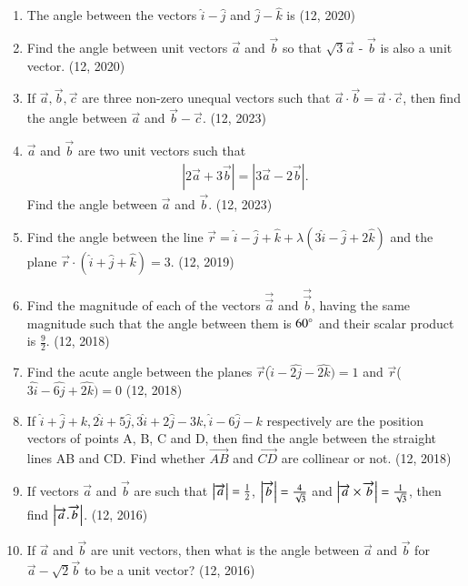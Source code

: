 \begin{enumerate}[label=\thesubsection.\arabic*, ref=\thesubsection.\theenumi]
\item The angle between the vectors $\hat{i} - \hat{j}$ and $\hat{j} - \hat{k}$ is
\hfill (12, 2020)
\item Find the angle between unit vectors $\overrightarrow{a}$ and $\overrightarrow{b}$ so that $\sqrt{3}\overrightarrow{a}$ - $\overrightarrow{b}$ is also a unit vector.
\hfill (12, 2020)
    \item If $\overrightarrow{a}, \overrightarrow{b}, \overrightarrow{c}$ are three non-zero unequal vectors such that $\overrightarrow{a} \cdot \overrightarrow{b} = \overrightarrow{a} \cdot \overrightarrow{c}$, then find the angle between $\overrightarrow{a}$ and $\overrightarrow{b} - \overrightarrow{c}$.
    \hfill (12, 2023)
    \item $\overrightarrow{a}$ and $\overrightarrow{b}$ are two unit vectors such that
    \begin{align}
        \left| 2\overrightarrow{a} + 3\overrightarrow{b} \right| = \left| 3\overrightarrow{a} - 2\overrightarrow{b} \right|.
    \end{align}
  Find the angle between $\overrightarrow{a}$ and $\overrightarrow{b}$.
    \hfill (12, 2023)
	\item Find the angle between the line $\overrightarrow{r} = \hat{i} - \hat{j} + \hat{k} + \lambda (3\hat{i} - \hat{j} + 2\hat{k})$ and the plane $\overrightarrow{r} \cdot (\hat{i} + \hat{j} + \hat{k}) = 3$. \hfill (12, 2019)
\item Find the magnitude of each of the vectors $\overrightarrow{\vec{a}}$ and $\overrightarrow{\vec{b}}$, having the same magnitude such that the angle between them is $60\degree$ and their scalar product is $\frac{9}{2}$. \hfill (12, 2018)
\item Find the acute angle between the planes $\vec{r}$($ \hat{i}-\hat{2j}-\hat{2k})=1$ and $\vec{r}$($ \hat{3i}-\hat{6j}+\hat{2k})=0$
\hfill (12, 2018)
\item If $\hat{i}+\hat{j}+{k} ,  2\hat{i}+5\hat{j} ,  3\hat{i}+2\hat{j}-3{k} ,  \hat{i}-6\hat{j}-{k}$ respectively are the position vectors of points A, B, C and D, then find the angle between the straight lines AB and CD. Find whether $\overrightarrow{AB}$ and $\overrightarrow{CD}$ are collinear or not. 
\hfill (12, 2018) 
\item If vectors $\overrightarrow{a}$ and $\overrightarrow{b}$ are such that
      $\left\vert\overrightarrow{a}\right\vert = \frac{1}{2}$, $\left\vert\overrightarrow{b}\right\vert = \frac{4}{\sqrt{3}}$
      and $\left\vert\overrightarrow{a} \times \overrightarrow{b}\right\vert = \frac{1}{\sqrt{3}}$, then find
      $\left\vert\overrightarrow{a}.\overrightarrow{b} \right\vert$. \hfill (12, 2016)
\item If $\overrightarrow{a}$ and $\overrightarrow{b}$ are unit vectors, then what is the angle between
      $\overrightarrow{a}$ and $\overrightarrow{b}$ for $\overrightarrow{a} - \sqrt{2}\overrightarrow{b}$ to be a unit vector? \hfill (12, 2016)


\end{enumerate}
